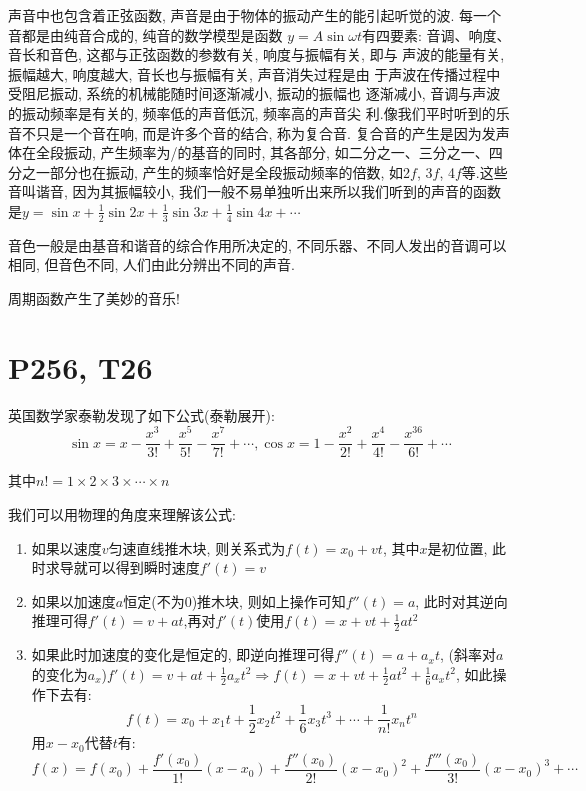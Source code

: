 \documentclass{book}
\begin{document}
    声音中也包含着正弦函数, 声音是由于物体的振动产生的能引起听觉的波. 每一个音都是由纯音合成的, 纯音的数学模型是函数 $y=A\sin \omega t$有四要素:  音调、响度、音长和音色, 这都与正弦函数的参数有关, 响度与振幅有关, 即与 声波的能量有关, 振幅越大, 响度越大, 音长也与振幅有关, 声音消失过程是由 于声波在传播过程中受阻尼振动, 系统的机械能随时间逐渐减小, 振动的振幅也 逐渐减小, 音调与声波的振动频率是有关的, 频率低的声音低沉, 频率高的声音尖
    利.像我们平时听到的乐音不只是一个音在响, 而是许多个音的结合, 称为复合音.  复合音的产生是因为发声体在全段振动, 产生频率为/的基音的同时, 其各部分,  如二分之一、三分之一、四分之一部分也在振动, 产生的频率恰好是全段振动频率的倍数, 如2$f$, 3$f$, 4$f$等.这些音叫谐音, 因为其振幅较小, 我们一般不易单独听出来所以我们听到的声音的函数是$\displaystyle y=\sin x+\frac{1}{2}\sin 2x+\frac{1}{3}\sin 3x+\frac{1}{4}\sin 4x+\cdots$

    音色一般是由基音和谐音的综合作用所决定的, 不同乐器、不同人发出的音调可以相同, 但音色不同, 人们由此分辨出不同的声音.
    
    周期函数产生了美妙的音乐!

    \section{\textcolor[rgb]{0.11,0.65,0.52}{P256, T26}}
    英国数学家泰勒发现了如下公式\textcolor[rgb]{0.38,0.11,0.2}{(泰勒展开)}:
    $$
    \sin x = x - \frac{x^3}{3!}+\frac{x^5}{5!}-\frac{x^7}{7!}+\cdots,
    \cos x = 1-\frac{x^2}{2!}+\frac{x^4}{4!}-\frac{x^36}{6!}+\cdots
    $$

    其中$n!=1\times2\times3\times\cdots\times n$

    我们可以用\textcolor[rgb]{0.75,0.17,0.22}{物理的角度}来理解该公式:

    \begin{enumerate}
        \item 如果以速度$v$匀速直线推木块, 则关系式为$f(t)=x_0+vt$, 其中$x$是初位置, 此时求导就可以得到瞬时速度$f'(t)=v$
        \item 如果以加速度$a$恒定(不为0)推木块, 则如上操作可知$f''(t)=a$, 此时对其逆向推理可得$f'(t)=v+at$,再对$\displaystyle f'(t)$使用$\displaystyle f(t) =x+vt+\frac{1}{2}at^2$
        \item 如果此时加速度的变化是恒定的, 即逆向推理可得$\displaystyle f''(t)=a+a_xt$, (斜率对$a$的变化为$a_x$)$\displaystyle f'(t)=v+at+\frac{1}{2}a_xt^2\Longrightarrow f(t)=x+vt+\frac{1}{2}at^2+\frac{1}{6}a_xt^2$, 如此操作下去有: $$f(t)=x_0+x_1t+\frac{1}{2}x_2t^2+\frac{1}{6}x_3t^3+\cdots+\frac{1}{n!}x_nt^n$$用$x-x_0$代替$t$有:$$f(x)=f(x_0)+\frac{f'(x_0)}{1!}(x-x_0)+\frac{f''(x_0)}{2!}(x-x_0)^2+\frac{f'''(x_0)}{3!}(x-x_0)^3+\cdots$$
    \end{enumerate}
\end{document}
